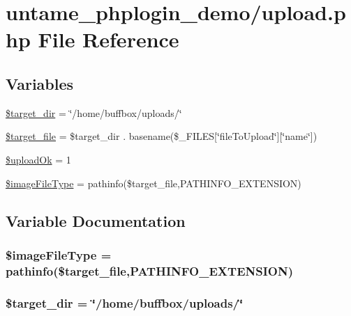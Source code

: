 \hypertarget{upload_8php}{}\section{untame\+\_\+phplogin\+\_\+demo/upload.php File Reference}
\label{upload_8php}
\subsection*{Variables}
\begin{DoxyCompactItemize}
\item 
\hyperlink{upload_8php_a52b70baf7228dbae970ed3a339da70ed}{\$target\+\_\+dir} = \char`\"{}/home/buffbox/uploads/\char`\"{}
\item 
\hyperlink{upload_8php_ad134630f62b222c8ba34432fabcc48d0}{\$target\+\_\+file} = \$target\+\_\+dir . basename(\$\+\_\+\+F\+I\+L\+E\+S\mbox{[}\char`\"{}file\+To\+Upload\char`\"{}\mbox{]}\mbox{[}\char`\"{}name\char`\"{}\mbox{]})
\item 
\hyperlink{upload_8php_a42eccad2f7111e239e2e693a3b4345f6}{\$upload\+Ok} = 1
\item 
\hyperlink{upload_8php_a8d80d70b09d99e7135c43cdb6042d722}{\$image\+File\+Type} = pathinfo(\$target\+\_\+file,P\+A\+T\+H\+I\+N\+F\+O\+\_\+\+E\+X\+T\+E\+N\+S\+I\+O\+N)
\end{DoxyCompactItemize}


\subsection{Variable Documentation}
\hypertarget{upload_8php_a8d80d70b09d99e7135c43cdb6042d722}{}
\subsubsection[{\$image\+File\+Type}]{\setlength{\rightskip}{0pt plus 5cm}\$image\+File\+Type = pathinfo(\$target\+\_\+file,P\+A\+T\+H\+I\+N\+F\+O\+\_\+\+E\+X\+T\+E\+N\+S\+I\+O\+N)}\label{upload_8php_a8d80d70b09d99e7135c43cdb6042d722}
\hypertarget{upload_8php_a52b70baf7228dbae970ed3a339da70ed}{}
\subsubsection[{\$target\+\_\+dir}]{\setlength{\rightskip}{0pt plus 5cm}\$target\+\_\+dir = \char`\"{}/home/buffbox/uploads/\char`\"{}}\label{upload_8php_a52b70baf7228dbae970ed3a339da70ed}
\hypertarget{upload_8php_ad134630f62b222c8ba34432fabcc48d0}{}

